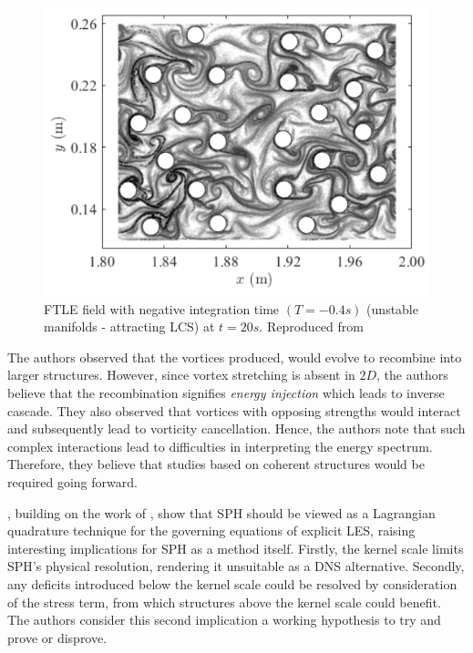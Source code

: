\begin{figure}[htbp!]
    \centering
    \includegraphics{Figures/research_papers/Canelas2016-ftle-field.png}
    \caption{FTLE field with negative integration time $(T = -0.4 s)$ (unstable manifolds - attracting LCS) at $t = 20s$. Reproduced from \cite{Canelas2016}}
    \label{fig:Canelas2016-ftle-field}
\end{figure}

The authors observed that the vortices produced, would evolve to recombine into larger structures. However, since vortex stretching is absent in $2D$, the authors believe that the recombination signifies \textit{energy injection} which leads to inverse cascade. They also observed that vortices with opposing strengths would interact and subsequently lead to vorticity cancellation. Hence, the authors note that such complex interactions lead to difficulties in interpreting the energy spectrum. Therefore, they believe that studies based on coherent structures would be required going forward.

\cite{Okraschevski2022}, building on the work of \cite{hardy1982formulas}, show that SPH should be viewed as a Lagrangian quadrature technique for the governing equations of explicit LES, raising interesting implications for SPH as a method itself. Firstly, the kernel scale limits SPH’s physical resolution, rendering it unsuitable as a DNS alternative. Secondly, any deficits introduced below the kernel scale could be resolved by consideration of the stress term, from which structures above the kernel scale could benefit. The authors consider this second implication a working hypothesis to try and prove or disprove.

